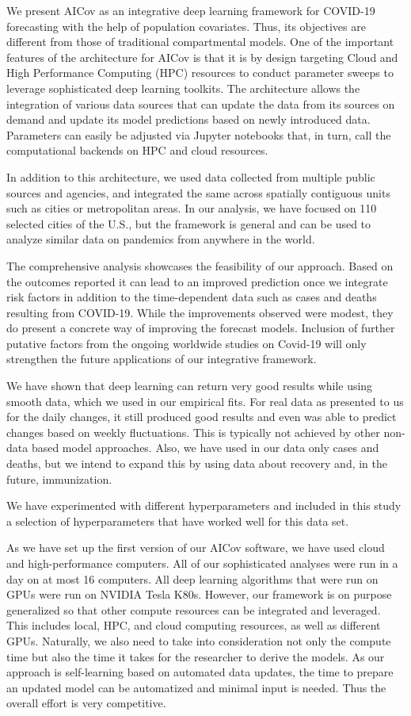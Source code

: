 \documentclass[a4paper, inpress]{jds} %
\renewcommand{\_}{%
    \textunderscore\hspace{0pt}%
}
\begin{document}
We present AICov as an integrative deep learning framework for
COVID-19 forecasting with the help of population covariates. Thus, its
objectives are different from those of traditional compartmental
models. One of the important features of the architecture for AICov is
that it is by design targeting Cloud and High Performance Computing
(HPC) resources to conduct parameter sweeps to leverage sophisticated
deep learning toolkits. The architecture allows the integration of
various data sources that can update the data from its sources on
demand and update its model predictions based on newly introduced
data. Parameters can easily be adjusted via Jupyter notebooks that, in
turn, call the computational backends on HPC and cloud resources.

In addition to this architecture, we used data collected from multiple
public sources and agencies, and integrated the same across spatially
contiguous units such as cities or metropolitan areas. In our
analysis, we have focused on 110 selected cities of the U.S., but the
framework is general and can be used to analyze similar data on
pandemics from anywhere in the world.

The comprehensive analysis showcases the feasibility of our
approach. Based on the outcomes reported it can lead to an improved
prediction once we integrate risk factors in addition to the
time-dependent data such as cases and deaths resulting from
COVID-19. While the improvements observed were modest, they do present
a concrete way of improving the forecast models. Inclusion of further
putative factors from the ongoing worldwide studies on Covid-19 will
only strengthen the future applications of our integrative framework.

We have shown that deep learning can return very good results while
using smooth data, which we used in our empirical fits. For real data
as presented to us for the daily changes, it still produced good
results and even was able to predict changes based on weekly
fluctuations. This is typically not achieved by other non-data based
model approaches. Also, we have used in our data only cases and
deaths, but we intend to expand this by using data about recovery and,
in the future, immunization.

We have experimented with different hyperparameters and included in
this study a selection of hyperparameters that have worked well for
this data set.


As we have set up the first version of our AICov software, we have
used cloud and high-performance computers. All of our sophisticated
analyses were run in a day on at most 16 computers. All deep learning
algorithms that were run on GPUs were run on NVIDIA Tesla
K80s. However, our framework is on purpose generalized so that other
compute resources can be integrated and leveraged. This includes
local, HPC, and cloud computing resources, as well as different
GPUs. Naturally, we also need to take into consideration not only the
compute time but also the time it takes for the researcher to derive
the models. As our approach is self-learning based on automated data
updates, the time to prepare an updated model can be automatized and
minimal input is needed. Thus the overall effort is very competitive.
\end{document}
